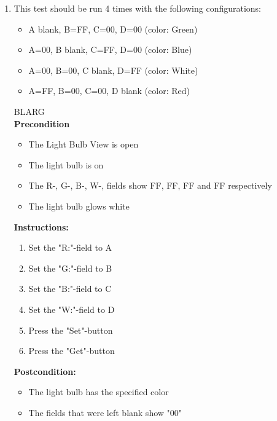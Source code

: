 \documentclass[a4paper]{article}
\newlength{\testlabellength}
\newenvironment{testlist}{\begin{enumerate}[label=\bfseries Instruction \thesubsection.\arabic* , labelindent=0pt, labelwidth=\testlabellength , leftmargin=2cm]}{\end{enumerate}}
\newenvironment{precondition}{
{\color{white}BLARG}\\ 
\textbf{Precondition}
\begin{itemize}[labelindent=0cm, labelwidth=2cm , leftmargin=1cm]
}
{\end{itemize}}
\newenvironment{instruction}{
\textbf{Instructions:}
\begin{enumerate}[label=\bfseries  \arabic*., labelindent=0cm, labelwidth=2cm , leftmargin=1cm]
}
{\end{enumerate}}
\newenvironment{postcondition}{
\textbf{Postcondition:}
\begin{itemize}[labelindent=0cm, labelwidth=2cm , leftmargin=1cm]
}
{\end{itemize}}
\begin{document}
\begin{appendices}
\begin{testlist}
	\item This test should be run 4 times with the following configurations:
		\begin{itemize}
			\item A blank, B=FF, C=00, D=00 (color: Green)
			\item A=00, B blank, C=FF, D=00 (color: Blue)
			\item A=00, B=00, C blank, D=FF (color: White)
			\item A=FF, B=00, C=00, D blank (color: Red)
		\end{itemize}
		\begin{precondition}
			\item The Light Bulb View is open
			\item The light bulb is on
			\item The R-, G-, B-, W-, fields show FF, FF, FF and FF respectively
			\item The light bulb glows white
		\end{precondition}
		\begin{instruction}
			\item Set the "R:"-field to A
			\item Set the "G:"-field to B
			\item Set the "B:"-field to C
			\item Set the "W:"-field to D
			\item Press the "Set"-button
			\item Press the "Get"-button
		\end{instruction}
		\begin{postcondition}
			\item The light bulb has the specified color
			\item The fields that were left blank show "00"
		\end{postcondition}
		


\end{testlist}
\end{appendices}
\end{document}
